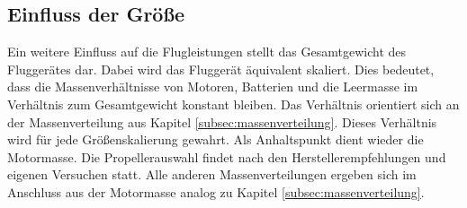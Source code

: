 \subsection{Einfluss der Größe}
\label{subsec:groesse}
Ein weitere Einfluss auf die Flugleistungen stellt das Gesamtgewicht des Fluggerätes dar. Dabei wird das Fluggerät äquivalent skaliert. Dies bedeutet, dass die Massenverhältnisse von Motoren, Batterien und die Leermasse im Verhältnis zum Gesamtgewicht konstant bleiben. Das Verhältnis orientiert sich an der Massenverteilung aus Kapitel \ref{subsec:massenverteilung}. Dieses Verhältnis wird für jede Größenskalierung gewahrt. Als Anhaltspunkt dient wieder die Motormasse. Die Propellerauswahl findet nach den Herstellerempfehlungen und eigenen Versuchen statt. Alle anderen Massenverteilungen ergeben sich im Anschluss aus der Motormasse analog zu Kapitel \ref{subsec:massenverteilung}.

